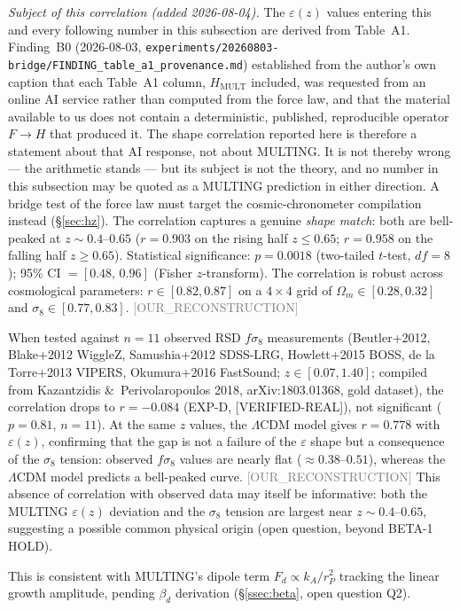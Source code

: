 \documentclass[twocolumn,prd,amsmath,amssymb,floatfix]{revtex4-2}
\newcommand{\reconstruction}{\textcolor{gray}{\small[OUR\_RECONSTRUCTION]}}
\begin{document}
\emph{Subject of this correlation (added 2026-08-04).}
The $\varepsilon(z)$ values entering this and every following number in
this subsection are derived from Table~A1. Finding~B0 (2026-08-03,
\texttt{experiments/20260803-bridge/FINDING\_table\_a1\_provenance.md})
established from the author's own caption that each Table~A1 column,
$H_\mathrm{MULT}$ included, was requested from an online AI service
rather than computed from the force law, and that the material available
to us does not contain a deterministic, published, reproducible operator
$F \to H$ that produced it.
The shape correlation reported here is therefore a statement about that
AI response, not about MULTING. It is not thereby wrong --- the
arithmetic stands --- but its subject is not the theory, and no number in
this subsection may be quoted as a MULTING prediction in either
direction. A bridge test of the force law must target the
cosmic-chronometer compilation instead (\S\ref{sec:hz}).
The correlation captures a genuine \emph{shape match}: both are bell-peaked at
$z \sim 0.4$--$0.65$ ($r = 0.903$ on the rising half $z \le 0.65$;
$r = 0.958$ on the falling half $z \ge 0.65$).
Statistical significance: $p = 0.0018$ (two-tailed $t$-test, $df=8$);
95\% CI $= [0.48,\,0.96]$ (Fisher $z$-transform).
The correlation is robust across cosmological parameters:
$r \in [0.82, 0.87]$ on a $4\times4$ grid of
$\Omega_m \in [0.28, 0.32]$ and $\sigma_8 \in [0.77, 0.83]$.
\reconstruction

When tested against $n=11$ observed RSD $f\sigma_8$ measurements
(Beutler+2012, Blake+2012 WiggleZ, Samushia+2012 SDSS-LRG,
Howlett+2015 BOSS, de la Torre+2013 VIPERS, Okumura+2016 FastSound;
$z \in [0.07, 1.40]$; compiled from Kazantzidis \&\ Perivolaropoulos 2018,
arXiv:1803.01368, gold dataset), the correlation drops to $r = -0.084$
(EXP-D, [VERIFIED-REAL]), not significant ($p = 0.81$, $n=11$).
At the same $z$ values, the $\Lambda$CDM model gives $r = 0.778$ with $\varepsilon(z)$,
confirming that the gap is not a failure of the $\varepsilon$ shape but a
consequence of the $\sigma_8$ tension: observed $f\sigma_8$ values are
nearly flat ($\approx 0.38$--$0.51$), whereas the $\Lambda$CDM model
predicts a bell-peaked curve. \reconstruction
This absence of correlation with observed data may itself be informative:
both the MULTING $\varepsilon(z)$ deviation and the $\sigma_8$ tension
are largest near $z \sim 0.4$--$0.65$, suggesting a possible common
physical origin (open question, beyond BETA-1 HOLD).

This is consistent with MULTING's dipole term $F_d \propto k_A/r_P^2$
tracking the linear growth amplitude, pending $\beta_d$ derivation
(§\ref{ssec:beta}, open question Q2).
\end{document}
